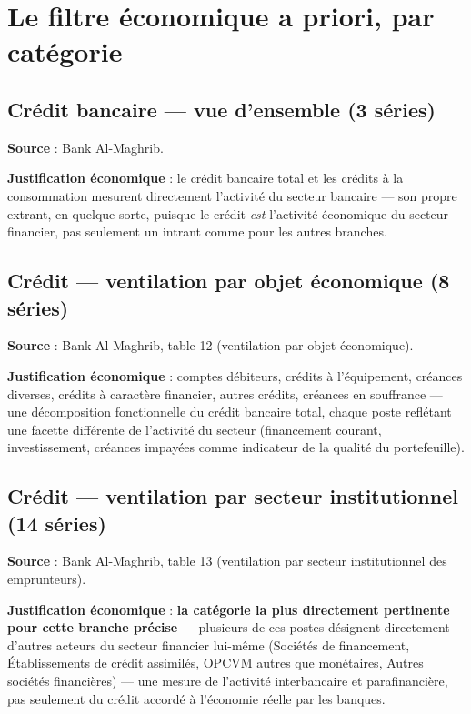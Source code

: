 \documentclass[11pt,a4paper]{article}
\begin{document}
\section{Le filtre économique a priori, par catégorie}

\subsection{Crédit bancaire --- vue d'ensemble (3 séries)}

\textbf{Source} : Bank Al-Maghrib.

\textbf{Justification économique} : le crédit bancaire total et les crédits à la consommation mesurent directement l'activité du secteur bancaire --- son propre extrant, en quelque sorte, puisque le crédit \emph{est} l'activité économique du secteur financier, pas seulement un intrant comme pour les autres branches.

\subsection{Crédit --- ventilation par objet économique (8 séries)}

\textbf{Source} : Bank Al-Maghrib, table 12 (ventilation par objet économique).

\textbf{Justification économique} : comptes débiteurs, crédits à l'équipement, créances diverses, crédits à caractère financier, autres crédits, créances en souffrance --- une décomposition fonctionnelle du crédit bancaire total, chaque poste reflétant une facette différente de l'activité du secteur (financement courant, investissement, créances impayées comme indicateur de la qualité du portefeuille).

\subsection{Crédit --- ventilation par secteur institutionnel (14 séries)}

\textbf{Source} : Bank Al-Maghrib, table 13 (ventilation par secteur institutionnel des emprunteurs).

\textbf{Justification économique} : \textbf{la catégorie la plus directement pertinente pour cette branche précise} --- plusieurs de ces postes désignent directement d'autres acteurs du secteur financier lui-même (Sociétés de financement, Établissements de crédit assimilés, OPCVM autres que monétaires, Autres sociétés financières) --- une mesure de l'activité interbancaire et parafinancière, pas seulement du crédit accordé à l'économie réelle par les banques.
\end{document}
